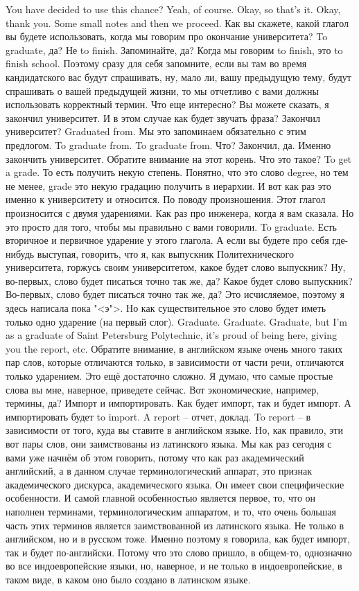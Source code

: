 \documentclass[main.tex]{subfiles}
\begin{document}
You have decided to use this chance? Yeah, of course.
Okay, so that's it.
Okay, thank you.
Some small notes and then we proceed.
Как вы скажете, какой глагол вы будете использовать, когда мы говорим про окончание университета?
To graduate, да?
Не to finish.
Запоминайте, да? Когда мы говорим to finish, это to finish school.
Поэтому сразу для себя запомните, если вы там во время кандидатского вас будут спрашивать, ну, мало ли, вашу предыдущую тему, будут спрашивать о вашей предыдущей жизни, то мы отчетливо с вами должны использовать корректный термин.
Что еще интересно? Вы можете сказать, я закончил университет.
И в этом случае как будет звучать фраза? Закончил университет?
Graduated from.
Мы это запоминаем обязательно с этим предлогом.
To graduate from.
To graduate from.
Что? Закончил, да.
Именно закончить университет.
Обратите внимание на этот корень.
Что это такое? To get a grade.
То есть получить некую степень.
Понятно, что это слово degree, но тем не менее, grade это некую градацию получить в иерархии.
И вот как раз это именно к университету и относится.
По поводу произношения.
Этот глагол произносится с двумя ударениями.
Как раз про инженера, когда я вам сказала.
Но это просто для того, чтобы мы правильно с вами говорили.
To graduate.
Есть вторичное и первичное ударение у этого глагола.
А если вы будете про себя где-нибудь выступая, говорить, что я, как выпускник Политехнического университета, горжусь своим университетом, какое будет слово выпускник?
Ну, во-первых, слово будет писаться точно так же, да?
Какое будет слово выпускник?
Во-первых, слово будет писаться точно так же, да?
Это исчисляемое, поэтому я здесь написала пока "<э">.
Но как существительное это слово будет иметь только одно ударение (на первый слог).
Graduate.
Graduate.
Graduate, but I'm as a graduate of Saint Petersburg Polytechnic, it's proud of being here, giving you the report, etc.
Обратите внимание, в английском языке очень много таких пар слов, которые отличаются только, в зависимости от части речи, отличаются только ударением.
Это ещё достаточно сложно.
Я думаю, что самые простые слова вы мне, наверное, приведете сейчас.
Вот экономические, например, термины, да? Импорт и импортировать.
Как будет импорт, так и будет импорт.
А импортировать будет to import.
A report -- отчет, доклад.
To report -- в зависимости от того, куда вы ставите в английском языке.
Но, как правило, эти вот пары слов, они заимствованы из латинского языка.
Мы как раз сегодня с вами уже начнём об этом говорить, потому что как раз академический английский, а в данном случае терминологический аппарат, это признак академического дискурса, академического языка.
Он имеет свои специфические особенности.
И самой главной особенностью является первое, то, что он наполнен терминами, терминологическим аппаратом, и то, что очень большая часть этих терминов является заимствованной из латинского языка.
Не только в английском, но и в русском тоже.
Именно поэтому я говорила, как будет импорт, так и будет по-английски.
Потому что это слово пришло, в общем-то, однозначно во все индоевропейские языки, но, наверное, и не только в индоевропейские, в таком виде, в каком оно было создано в латинском языке.
\end{document}
